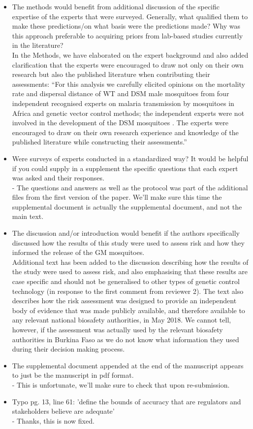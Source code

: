 \documentclass[12pt]{paper}
\begin{document}
{\begin{itemize}
\item  The methods would benefit from additional discussion of the specific expertise of the experts that were surveyed. Generally, what qualified them to make these predictions/on what basis were the predictions made? Why was this approach preferable to acquiring priors from lab-based studies currently in the literature?\\
{ \color{red} In the Methods, we have elaborated on the expert background and also added clarification that the experts were encouraged to draw not only on their own research but also the published literature when contributing their assessments: 
``For this analysis we carefully elicited opinions on the mortality rate and dispersal distance of WT and DSM male mosquitoes from four independent recognised experts on malaria transmission by mosquitoes in Africa and genetic vector control methods; the independent experts were not involved in the development of the DSM mosquitoes \cite{Hayes2015a}. The experts were encouraged to draw on their own research experience and knowledge of the published literature while constructing their assessments.''}
\item   Were surveys of experts conducted in a standardized way? It would be helpful if you could supply in a supplement the specific questions that each expert was asked and their responses.\\
{\color{red} - The questions and answers as well as the protocol was part of the additional files from the first version of the paper. We'll make sure this time the supplemental document is actually the supplemental document, and not the main text.}
\item  The discussion and/or introduction would benefit if the authors specifically discussed how the results of this study were used to assess risk and how they informed the release of the GM mosquitoes.\\
{\color{red} Additional text has been added to the discussion describing how the results of the study were used to assess risk, and also emphasising that these results are case specific and should not be generalised to other types of genetic control technology (in response to the first comment from reviewer 2). The text also describes how the risk assessment was designed to provide an independent body of evidence that was made publicly available, and therefore available to any relevant national biosafety authorities, in May 2018. We cannot tell, however, if the assessment was actually used by the relevant biosafety authorities in Burkina Faso as we do not know what information they used during their decision making process.}
\item  The supplemental document appended at the end of the manuscript appears to just be the manuscript in pdf format.\\
{\color{red} - This is unfortunate, we'll make sure to check that upon re-submission.}
\item  Typo pg. 13, line 61: 'define the bounds of accuracy that are regulators and stakeholders believe are adequate'\\
{\color{red} - Thanks, this is now fixed.}
\end{itemize}
}
\end{document}
